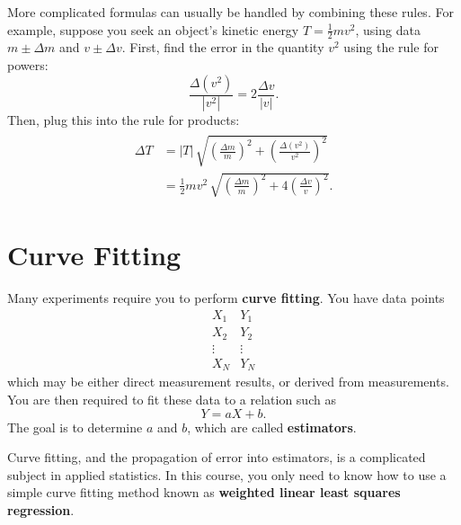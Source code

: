 \documentclass[11pt,a4paper]{article}
\begin{document}
More complicated formulas can usually be handled by combining these
rules.  For example, suppose you seek an object's kinetic energy $T =
\frac{1}{2}mv^2$, using data $m \pm \Delta m$ and $v \pm \Delta v$.
First, find the error in the quantity $v^2$ using the rule for powers:
\begin{equation*}
  \frac{\Delta (v^2)}{|v^2|} = 2 \frac{\Delta v}{|v|}.
\end{equation*}
Then, plug this into the rule for products:
\begin{align}
  \begin{aligned}
    \Delta T &= |T|\, \sqrt{\left(\frac{\Delta m}{m}\right)^2
      + \left(\frac{\Delta (v^2)}{v^2}\right)^2} \\
    &= \frac{1}{2} m v^2\, \sqrt{\left(\frac{\Delta m}{m}\right)^2
      + 4 \left(\frac{\Delta v}{v}\right)^2}.
  \end{aligned} \nonumber
\end{align}

\section{Curve Fitting}

Many experiments require you to perform \textbf{curve fitting}.  You
have data points
\begin{equation*}
  \begin{array}{c}X_1 \\ X_2 \\ \vdots \\ X_N \end{array}
  \begin{array}{c}Y_1 \\ Y_2 \\ \vdots \\ Y_N \end{array}
\end{equation*}
which may be either direct measurement results, or derived from
measurements.  You are then required to fit these data to a relation
such as
\begin{equation*}
  Y = a X + b.
\end{equation*}
The goal is to determine $a$ and $b$, which are called
\textbf{estimators}.

Curve fitting, and the propagation of error into estimators, is a
complicated subject in applied statistics.  In this course, you only
need to know how to use a simple curve fitting method known as
\textbf{weighted linear least squares regression}.
\end{document}
